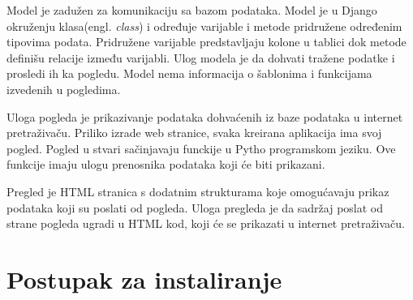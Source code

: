\documentclass[12pt]{article}
\begin{document}
Model je zadužen za komunikaciju sa bazom podataka. Model je u Django okruženju klasa(engl. \textsl{class}) i određuje varijable i metode pridružene određenim tipovima podata. Pridružene varijable predstavljaju kolone u tablici dok metode definišu relacije između varijabli.  Ulog modela je da dohvati tražene podatke i prosledi ih ka pogledu.  Model nema informacija o šablonima i funkcijama izvedenih u pogledima. 

Uloga pogleda je prikazivanje podataka dohvaćenih iz baze podataka u internet pretraživaču. Priliko izrade web stranice, svaka kreirana aplikacija ima svoj pogled.  Pogled u stvari sačinjavaju funckije u Pytho programskom jeziku.  Ove funkcije imaju ulogu prenosnika podataka koji će biti prikazani.  

Pregled je HTML stranica s dodatnim strukturama koje omogućavaju prikaz podataka koji su poslati od pogleda.  Uloga pregleda je da sadržaj poslat od strane pogleda ugradi u HTML kod, koji će se prikazati u internet pretraživaču. 

\newpage
\section{Postupak za instaliranje}
\end{document}
